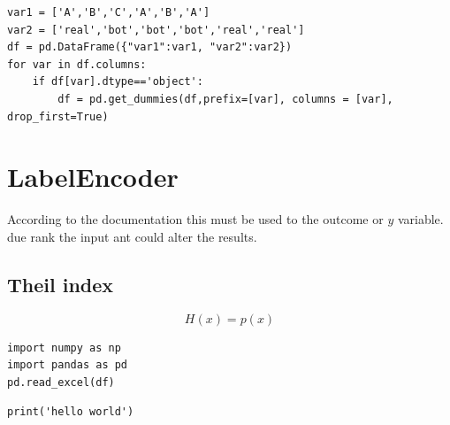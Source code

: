 \documentclass[10pt,a4paper]{article}
\begin{document}
\begin{lstlisting}
var1 = ['A','B','C','A','B','A']
var2 = ['real','bot','bot','bot','real','real']
df = pd.DataFrame({"var1":var1, "var2":var2})
for var in df.columns:
    if df[var].dtype=='object':
        df = pd.get_dummies(df,prefix=[var], columns = [var], drop_first=True)
\end{lstlisting}




\section{LabelEncoder}
According to the documentation this must be  used to the outcome or $y$ variable.
due rank the input ant could alter the results.


\subsection{Theil index}

\begin{equation}
H(x) = p(x)
\end{equation}

\begin{lstlisting}
import numpy as np
import pandas as pd
pd.read_excel(df)

\end{lstlisting}


\begin{verbatim}
print('hello world')
\end{verbatim}
\end{document}
